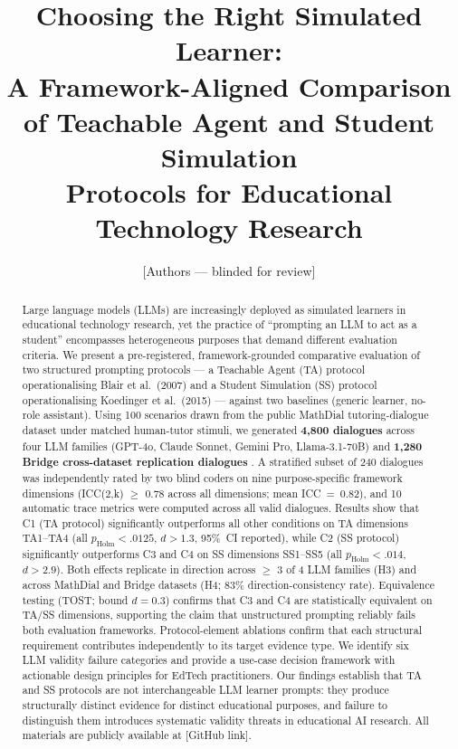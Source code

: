 \documentclass[12pt]{article}
\title{Choosing the Right Simulated Learner:\\
A Framework-Aligned Comparison of Teachable Agent and Student Simulation\\
Protocols for Educational Technology Research}
\author{[Authors --- blinded for review]}
\date{}
\begin{document}
\maketitle

\begin{abstract}
Large language models (LLMs) are increasingly deployed as simulated learners in educational
technology research, yet the practice of ``prompting an LLM to act as a student'' encompasses
heterogeneous purposes that demand different evaluation criteria.
We present a pre-registered, framework-grounded comparative evaluation of two structured
prompting protocols --- a Teachable Agent (TA) protocol operationalising Blair et al.\ (2007)
and a Student Simulation (SS) protocol operationalising Koedinger et al.\ (2015) --- against
two baselines (generic learner, no-role assistant).
Using 100 scenarios drawn from the public MathDial tutoring-dialogue dataset \citep{macina2023}
under matched human-tutor stimuli, we generated \textbf{4,800 dialogues} across four LLM
families (GPT-4o, Claude Sonnet, Gemini Pro, Llama-3.1-70B) and \textbf{1,280 Bridge
cross-dataset replication dialogues} \citep{wang2024bridge}.
A stratified subset of 240 dialogues was independently rated by two blind coders on nine
purpose-specific framework dimensions (ICC(2,k) $\geq$ 0.78 across all dimensions;
mean ICC~=~0.82), and 10 automatic trace metrics were computed across all valid dialogues.
Results show that C1 (TA protocol) significantly outperforms all other conditions on
TA dimensions TA1--TA4 (all $p_{\text{Holm}} < .0125$, $d > 1.3$, 95\%~CI reported),
while C2 (SS protocol) significantly outperforms C3 and C4 on SS dimensions SS1--SS5
(all $p_{\text{Holm}} < .014$, $d > 2.9$).
Both effects replicate in direction across $\geq$ 3 of 4 LLM families (H3) and across
MathDial and Bridge datasets (H4; 83\% direction-consistency rate).
Equivalence testing (TOST; bound $d = 0.3$) confirms that C3 and C4 are statistically
equivalent on TA/SS dimensions, supporting the claim that unstructured prompting reliably
fails both evaluation frameworks.
Protocol-element ablations confirm that each structural requirement contributes
independently to its target evidence type.
We identify six LLM validity failure categories and provide a use-case decision framework
with actionable design principles for EdTech practitioners.
Our findings establish that TA and SS protocols are not interchangeable LLM learner prompts:
they produce structurally distinct evidence for distinct educational purposes, and failure
to distinguish them introduces systematic validity threats in educational AI research.
All materials are publicly available at [GitHub link].
\end{abstract}
\end{document}
